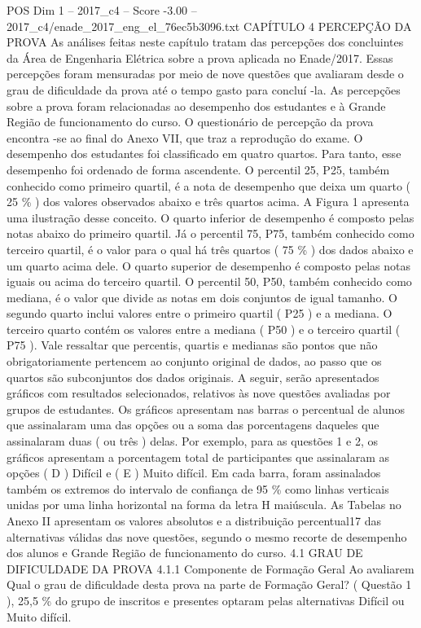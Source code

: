 \begin{textsample}{POS Dim 1 – 2017\_c4 – Score -3.00 – 2017\_c4/enade\_2017\_eng\_el\_76ec5b3096.txt}  \label{ex:f1_pos_275}
CAPÍTULO 4 PERCEPÇÃO DA PROVA As análises feitas neste capítulo tratam das percepções dos concluintes da Área de Engenharia Elétrica sobre a prova aplicada no Enade/2017.
Essas percepções foram mensuradas por meio de nove questões que avaliaram desde o grau de dificuldade da prova até o tempo gasto para concluí -la.
As percepções sobre a prova foram relacionadas ao desempenho dos estudantes e à Grande Região de funcionamento do curso.
O questionário de percepção da prova encontra -se ao final do Anexo VII, que traz a reprodução do exame.
O desempenho dos estudantes foi classificado em quatro quartos.
Para tanto, esse desempenho foi ordenado de forma ascendente.
O percentil 25, P25, também conhecido como primeiro quartil, é a nota de desempenho que deixa um quarto ( 25 \% ) dos valores observados abaixo e três quartos acima.
A Figura 1 apresenta uma ilustração desse conceito.
O quarto inferior de desempenho é composto pelas notas abaixo do primeiro quartil.
Já o percentil 75, P75, também conhecido como terceiro quartil, é o valor para o qual há três quartos ( 75 \% ) dos dados abaixo e um quarto acima dele.
O quarto superior de desempenho é composto pelas notas iguais ou acima do terceiro quartil.
O percentil 50, P50, também conhecido como mediana, é o valor que divide as notas em dois conjuntos de igual tamanho.
O segundo quarto inclui valores entre o primeiro quartil ( P25 ) e a mediana.
O terceiro quarto contém os valores entre a mediana ( P50 ) e o terceiro quartil ( P75 ).
Vale ressaltar que percentis, quartis e medianas são pontos que não obrigatoriamente pertencem ao conjunto original de dados, ao passo que os quartos são subconjuntos dos dados originais.
A seguir, serão apresentados gráficos com resultados selecionados, relativos às nove questões avaliadas por grupos de estudantes.
Os gráficos apresentam nas barras o percentual de alunos que assinalaram uma das opções ou a soma das porcentagens daqueles que assinalaram duas ( ou três ) delas.
Por exemplo, para as questões 1 e 2, os gráficos apresentam a porcentagem total de participantes que assinalaram as opções ( D ) Difícil e ( E ) Muito difícil.
Em cada barra, foram assinalados também os extremos do intervalo de confiança de 95 \% como linhas verticais unidas por uma linha horizontal na forma da letra H maiúscula.
As Tabelas no Anexo II apresentam os valores absolutos e a distribuição percentual17 das alternativas válidas das nove questões, segundo o mesmo recorte de desempenho dos alunos e Grande Região de funcionamento do curso. 4.1 GRAU DE DIFICULDADE DA PROVA 4.1.1 Componente de Formação Geral Ao avaliarem Qual o grau de dificuldade desta prova na parte de Formação Geral? ( Questão 1 ), 25,5 \% do grupo de inscritos e presentes optaram pelas alternativas Difícil ou Muito difícil.

\end{textsample}

